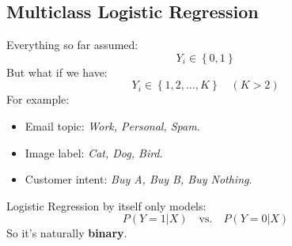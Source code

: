 \subsection{Multiclass Logistic Regression}

Everything so far assumed:
\begin{equation*}
    Y_i \in \left\{0, 1\right\}
\end{equation*}
But what if we have:
\begin{equation*}
    Y_i \in \left\{1, 2, \dots, K\right\} \quad \left(K > 2\right)
\end{equation*}
For example:
\begin{itemize}
    \item Email topic: \emph{Work, Personal, Spam}.
    \item Image label: \emph{Cat, Dog, Bird}.
    \item Customer intent: \emph{Buy A, Buy B, Buy Nothing}.
\end{itemize}
Logistic Regression by itself only models:
\begin{equation*}
    P\left(Y = 1 | X\right) \quad \text{vs.} \quad P\left(Y = 0 | X\right)
\end{equation*}
So it's naturally \textbf{binary}.

